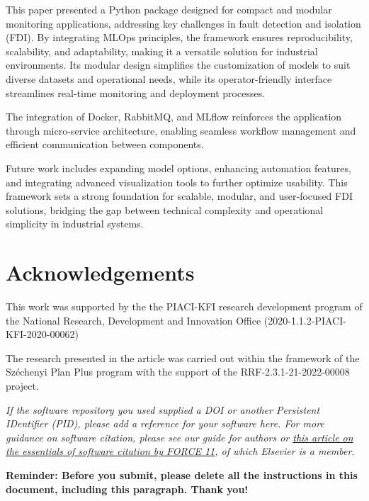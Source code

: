 \documentclass[preprint,12pt, a4paper]{elsarticle}
\begin{document}
This paper presented a Python package designed for compact and modular monitoring applications, addressing key challenges in fault detection and isolation (FDI). By integrating MLOps principles, the framework ensures reproducibility, scalability, and adaptability, making it a versatile solution for industrial environments. Its modular design simplifies the customization of models to suit diverse datasets and operational needs, while its operator-friendly interface streamlines real-time monitoring and deployment processes.

The integration of Docker, RabbitMQ, and MLflow reinforces the application through micro-service architecture, enabling seamless workflow management and efficient communication between components. 


Future work includes expanding model options, enhancing automation features, and integrating advanced visualization tools to further optimize usability. This framework sets a strong foundation for scalable, modular, and user-focused FDI solutions, bridging the gap between technical complexity and operational simplicity in industrial systems.

\section*{Acknowledgements}
This work was supported by the the PIACI-KFI research development program of the National Research, Development and Innovation Office (2020-1.1.2-PIACI-KFI-2020-00062)

The research presented in the article was carried out within the framework of the Széchenyi Plan Plus program with the support of the RRF-2.3.1-21-2022-00008 project.

 







\textit{If the software repository you used supplied a DOI or another
Persistent IDentifier (PID), please add a reference for your software
here. For more guidance on software citation, please see our guide for
authors or \href{https://f1000research.com/articles/9-1257/v2}{this
  article on the essentials of software citation by FORCE 11}, of
which Elsevier is a member.}

\large{\textbf{Reminder: Before you submit, please delete all 
the instructions in this document, 
including this paragraph. 
Thank you!}}
\end{document}
